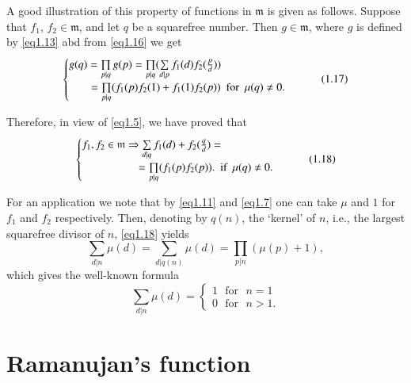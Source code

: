 A good illustration of this property of functions in $\mathfrak{m}$ is
given as follows. Suppose that $f_1$, $f_2 \in \mathfrak{m}$, and let $q$
be a squarefree number. Then $g\in \mathfrak{m}$, where $g$ is defined
by \eqref{eq1.13} abd from \eqref{eq1.16} we get  
\begin{equation*}%
\begin{cases}
g(q)=\prod\limits_{p|q} g(p)= \prod\limits_{p|q}(\sum\limits_{d|p}
f_1(d) f_2 (\frac{p}{d}))\\  
\hspace{0.7cm}=\prod\limits_{p|q} (f_1(p) f_2(1) + f_1(1) f_2(p))
\text{~ for~ } \mu(q)\neq 0. 
\end{cases}\tag{1.17}\label{eq1.17}
\end{equation*}

Therefore, in view of \eqref{eq1.5}, we have proved that 
\begin{equation*}%
\begin{cases}
f_1,f_2\in \mathfrak{m}\Rightarrow \sum\limits_{d|q}f_1(d) + f_2(\frac{q}{d})=\\
\hspace{1.8cm}= \prod\limits_{p|q}(f_1(p)f_2(p)). \text{~ if~ }
\mu(q) \neq 0. 
\end{cases} \tag{1.18}\label{eq1.18}
\end{equation*}

For an application we note that by \eqref{eq1.11} and \eqref{eq1.7}
one can take $\mu$ and $1$ for $f_1$ and $f_2$ respectively. Then,
denoting by $q(n)$, the `kernel' of $n$, i.e., the largest squarefree
divisor of $n$, \eqref{eq1.18} yields  
\begin{equation*}%
\sum_{d|n}\mu(d)= \sum_{d|q(n)}\mu(d)=\prod_{p|n}(\mu(p)+1),
\tag{1.19}\label{eq1.19} 
\end{equation*}
which gives the well-known formula 
\begin{equation*}%
\sum_{d|n}\mu(d)=
\begin{cases}
1 \text{~   for~ } n=1\\
0 \text{~   for~ } n>1.
\end{cases} \tag{1.20}\label{eq1.20}
\end{equation*}

\section{Ramanujan's function}\label{chap1-sec2}\pageoriginale

